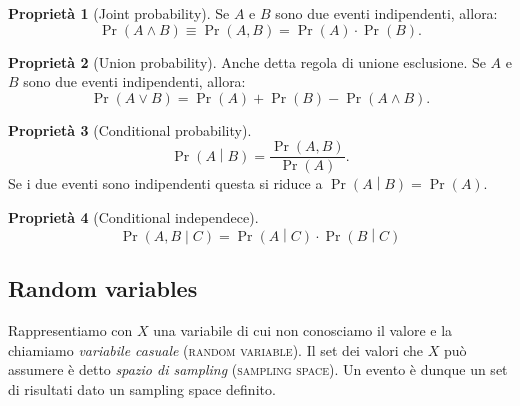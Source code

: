 \documentclass[10pt]{article}
\newcommand{\im}[1]{\textsc{#1}}
\newcommand{\et}{\wedge}
\newcommand{\orr}{\vee}
\newcommand{\cond}{\middle|}
\newcommand{\pare}[1]{
	\ensuremath{\left(#1\right)}
}
\theoremstyle{definition}
\theoremstyle{definition}
\newtheorem{property}{Proprietà}[subsection]
\DeclareMathOperator{\pr}{Pr}
\begin{document}
\begin{property}[Joint probability]
Se $A$ e $B$ sono due eventi indipendenti, allora:
\begin{equation}
\pr\pare{A\et B} \equiv \pr\pare{A, B} = \pr\pare{A} \cdot \pr\pare{B}.
\end{equation}
\end{property}

\begin{property}[Union probability]
Anche detta regola di unione esclusione. Se $A$ e $B$ sono due eventi indipendenti, allora:
\begin{equation}
\pr\pare{A\orr B} = \pr\pare{A} + \pr\pare{B} - \pr\pare{A\et B}.
\end{equation}
\end{property}

\begin{property}[Conditional probability]
\begin{equation}
\pr\pare{A\cond B} = \frac{\pr\pare{A, B}}{\pr\pare{A}}.
\end{equation}
Se i due eventi sono indipendenti questa si riduce a $\pr\pare{A\cond B} = \pr\pare{A}$.
\end{property}

\begin{property}[Conditional independece]
\begin{equation}
\pr\pare{A, B \cond C} = \pr\pare{A\cond C} \cdot \pr\pare{B\cond C}
\end{equation}
\end{property}

\subsection{Random variables}
Rappresentiamo con $X$ una variabile di cui non conosciamo il valore e la chiamiamo \textit{variabile casuale} (\im{random variable}). Il set dei valori che $X$ può assumere è detto \textit{spazio di sampling} (\im{sampling space}). Un evento è dunque un set di risultati dato un sampling space definito.
\end{document}
